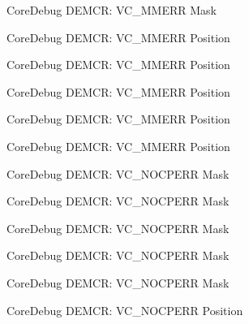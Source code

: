 \begin{DoxyRefList}
\label{deprecated__deprecated000519}%
%
Core\+Debug D\+E\+M\+CR\+: V\+C\+\_\+\+M\+M\+E\+RR Mask  
\item[Member \mbox{\hyperlink{group__CMSIS__CoreDebug_ga444454f7c7748e76cd76c3809c887c41}{Core\+Debug\+\_\+\+D\+E\+M\+C\+R\+\_\+\+V\+C\+\_\+\+M\+M\+E\+R\+R\+\_\+\+Pos}} ]\label{deprecated__deprecated000067}%
%
Core\+Debug D\+E\+M\+CR\+: V\+C\+\_\+\+M\+M\+E\+RR Position 

\label{deprecated__deprecated000211}%
%
Core\+Debug D\+E\+M\+CR\+: V\+C\+\_\+\+M\+M\+E\+RR Position 

\label{deprecated__deprecated000353}%
%
Core\+Debug D\+E\+M\+CR\+: V\+C\+\_\+\+M\+M\+E\+RR Position 

\label{deprecated__deprecated000429}%
%
Core\+Debug D\+E\+M\+CR\+: V\+C\+\_\+\+M\+M\+E\+RR Position 

\label{deprecated__deprecated000518}%
%
Core\+Debug D\+E\+M\+CR\+: V\+C\+\_\+\+M\+M\+E\+RR Position  
\item[Member \mbox{\hyperlink{group__CMSIS__CoreDebug_ga03ee58b1b02fdbf21612809034562f1c}{Core\+Debug\+\_\+\+D\+E\+M\+C\+R\+\_\+\+V\+C\+\_\+\+N\+O\+C\+P\+E\+R\+R\+\_\+\+Msk}} ]\label{deprecated__deprecated000066}%
%
Core\+Debug D\+E\+M\+CR\+: V\+C\+\_\+\+N\+O\+C\+P\+E\+RR Mask 

\label{deprecated__deprecated000210}%
%
Core\+Debug D\+E\+M\+CR\+: V\+C\+\_\+\+N\+O\+C\+P\+E\+RR Mask 

\label{deprecated__deprecated000352}%
%
Core\+Debug D\+E\+M\+CR\+: V\+C\+\_\+\+N\+O\+C\+P\+E\+RR Mask 

\label{deprecated__deprecated000428}%
%
Core\+Debug D\+E\+M\+CR\+: V\+C\+\_\+\+N\+O\+C\+P\+E\+RR Mask 

\label{deprecated__deprecated000517}%
%
Core\+Debug D\+E\+M\+CR\+: V\+C\+\_\+\+N\+O\+C\+P\+E\+RR Mask  
\item[Member \mbox{\hyperlink{group__CMSIS__CoreDebug_gac9d13eb2add61f610d5ced1f7ad2adf8}{Core\+Debug\+\_\+\+D\+E\+M\+C\+R\+\_\+\+V\+C\+\_\+\+N\+O\+C\+P\+E\+R\+R\+\_\+\+Pos}} ]\label{deprecated__deprecated000065}%
%
Core\+Debug D\+E\+M\+CR\+: V\+C\+\_\+\+N\+O\+C\+P\+E\+RR Position 


\end{DoxyRefList}
